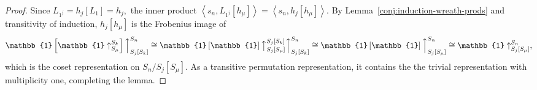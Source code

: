 \documentclass[ALCO, Unicode]{cedram}
\begin{document}
\begin{proof}
Since  $ L_{1^j} = h_j[L_1] = h_j,$ the inner product $\left \langle s_n, L_{1^j}[h_\mu] \right\rangle 
   = \left \langle s_n, h_j[h_\mu] \right\rangle.$ By Lemma~\ref{conj:induction-wreath-prods} and transitivity of induction, $h_j[h_\mu]$ is the Frobenius image of \[\mathbb{1}\left[\mathbb{1} \uparrow_{S_\mu}^{S_k}\right]\Big \uparrow_{S_j[S_k]}^{S_n}\cong \mathbb{1}\left[\mathbb{1}\right]\big \uparrow_{S_j[S_\mu]}^{S_j[S_k]} \Big \uparrow_{S_j[S_k]}^{S_n} \cong \mathbb{1}\left[\mathbb{1}\right] \Big \uparrow_{S_j[S_\mu]}^{S_n} \cong \mathbb{1}\uparrow_{S_j[S_\mu]}^{S_n},\] which is the coset representation on $S_n/S_j[S_\mu].$ As a transitive permutation representation, it contains the the trivial representation with multiplicity one, completing the lemma. 
\end{proof}
\end{document}
